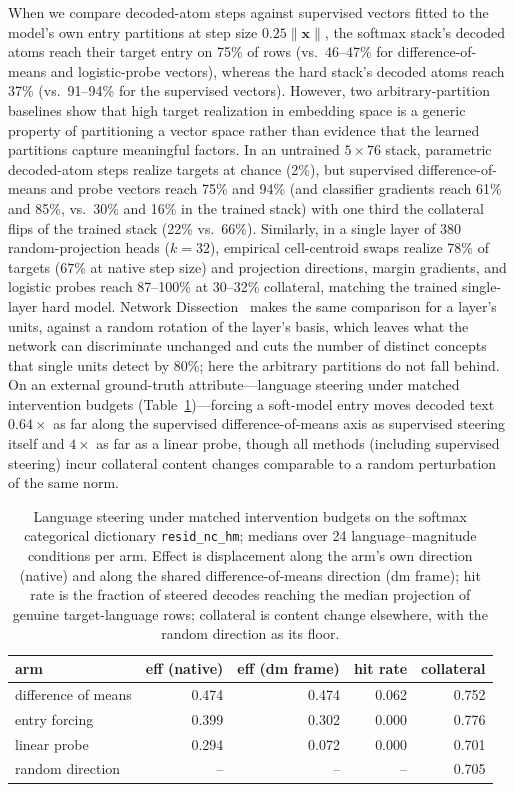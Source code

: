 When we compare decoded-atom steps against supervised vectors fitted to
the model's own entry partitions at step size
$0.25\lVert\mathbf{x}\rVert$, the softmax stack's decoded atoms reach
their target entry on 75\% of rows (vs.\ 46--47\% for difference-of-means
and logistic-probe vectors), whereas the hard stack's decoded atoms reach
37\% (vs.\ 91--94\% for the supervised vectors). However, two
arbitrary-partition baselines show that high target realization in
embedding space is a generic property of partitioning a vector space
rather than evidence that the learned partitions capture meaningful
factors. In an untrained $5\times76$ stack, parametric decoded-atom steps
realize targets at chance (2\%), but supervised difference-of-means and
probe vectors reach 75\% and 94\% (and classifier gradients reach 61\%
and 85\%, vs.\ 30\% and 16\% in the trained stack) with one third the
collateral flips of the trained stack (22\% vs.\ 66\%). Similarly, in a
single layer of 380 random-projection heads ($k{=}32$), empirical
cell-centroid swaps realize 78\% of targets ($67\%$ at native step size)
and projection directions, margin gradients, and logistic probes reach
87--100\% at 30--32\% collateral, matching the trained single-layer hard
model. Network Dissection~\cite[Sec.~3.2]{bau2017} makes the same comparison
for a layer's units, against a random rotation of the layer's basis, which
leaves what the network can discriminate unchanged and cuts the number of
distinct concepts that single units detect by 80\%; here the arbitrary
partitions do not fall behind. On an external ground-truth attribute---language steering under
matched intervention budgets (Table~\ref{tab:steer-overlay})---forcing a
soft-model entry moves decoded text $0.64\times$ as far along the
supervised difference-of-means axis as supervised steering itself and
$4\times$ as far as a linear probe, though all methods (including
supervised steering) incur collateral content changes comparable to a
random perturbation of the same norm.

\begin{table}[tp]\centering\small
\begin{tabular}{@{}lrrrr@{}}
\toprule
arm & eff (native) & eff (dm frame) & hit rate & collateral \\
\midrule
difference of means    & 0.474 & 0.474 & 0.062 & 0.752 \\
entry forcing          & 0.399 & 0.302 & 0.000 & 0.776 \\
linear probe           & 0.294 & 0.072 & 0.000 & 0.701 \\
random direction       & --    & --    & --   & 0.705 \\
\bottomrule
\end{tabular}
\caption{Language steering under matched intervention budgets on the
softmax categorical dictionary \texttt{resid\_nc\_hm}; medians over 24
language--magnitude conditions per arm. Effect is displacement along the
arm's own direction (native) and along the shared difference-of-means
direction (dm frame); hit rate is the fraction of steered decodes
reaching the median projection of genuine target-language rows;
collateral is content change elsewhere, with the random direction as its
floor.}
\label{tab:steer-overlay}
\end{table}

